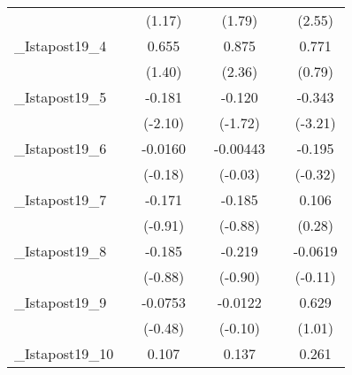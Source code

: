 {\begin{tabular}{l*{6}{c}}
            &                     &      (1.17)         &                     &      (1.79)         &                     &      (2.55)         \\
[1em]
\_Istapost19\_4&                     &       0.655         &                     &       0.875\sym{*}  &                     &       0.771         \\
            &                     &      (1.40)         &                     &      (2.36)         &                     &      (0.79)         \\
[1em]
\_Istapost19\_5&                     &      -0.181\sym{*}  &                     &      -0.120         &                     &      -0.343\sym{**} \\
            &                     &     (-2.10)         &                     &     (-1.72)         &                     &     (-3.21)         \\
[1em]
\_Istapost19\_6&                     &     -0.0160         &                     &    -0.00443         &                     &      -0.195         \\
            &                     &     (-0.18)         &                     &     (-0.03)         &                     &     (-0.32)         \\
[1em]
\_Istapost19\_7&                     &      -0.171         &                     &      -0.185         &                     &       0.106         \\
            &                     &     (-0.91)         &                     &     (-0.88)         &                     &      (0.28)         \\
[1em]
\_Istapost19\_8&                     &      -0.185         &                     &      -0.219         &                     &     -0.0619         \\
            &                     &     (-0.88)         &                     &     (-0.90)         &                     &     (-0.11)         \\
[1em]
\_Istapost19\_9&                     &     -0.0753         &                     &     -0.0122         &                     &       0.629         \\
            &                     &     (-0.48)         &                     &     (-0.10)         &                     &      (1.01)         \\
[1em]
\_Istapost19\_10&                     &       0.107         &                     &       0.137         &                     &       0.261         \\

\end{tabular}}
